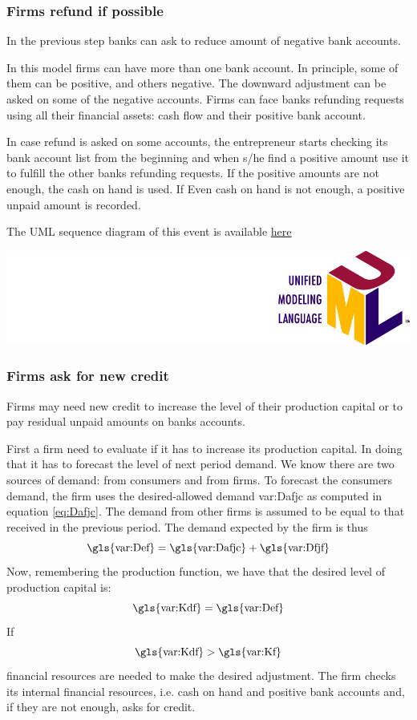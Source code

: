 \documentclass{book}
\newcommand{\doclocation}{file:///Users/giulioni/Documents/workspace/gabriele/docs}
\begin{document}
\subsubsection{Firms refund if possible}
In the previous step banks can ask to reduce amount of negative bank accounts. 

In this model firms can have more than one bank account. In principle, some of them can be positive, and others negative. The downward adjustment can be asked on some of the negative accounts.  Firms can face banks refunding requests using all their financial assets: cash flow and their positive bank account. 

In case refund is asked on some accounts, the entrepreneur starts checking its bank account list from the beginning and when s/he find a positive amount use it to fulfill the other banks refunding requests.
If the positive amounts are not enough, the cash on hand is used. If Even cash on hand is not enough, a positive unpaid amount is recorded.

The UML sequence diagram of this event is available \href{\doclocation/umldoc/firms_payBackBankDebt.html}{here}
\begin{marginfigure}
	\includegraphics[scale=0.1]{uml.png}
\end{marginfigure}


\subsubsection{Firms ask for new credit}

Firms may need new credit to increase the level of their production capital or to pay residual unpaid amounts on banks accounts.

First a firm need to evaluate if it has to increase its production capital. In doing that it has to forecast the level of next period demand. We know there are two sources of demand: from consumers and from firms. To forecast the consumers demand, the firm uses the desired-allowed demand \gls{var:Dafjc} as computed in equation \ref{eq:Dafjc}.   
The demand from other firms is assumed to be equal to that received in the previous period. The demand expected by the firm is thus
\[
	\textnormal{\gls{var:Def}}=\textnormal{\gls{var:Dafjc}}+\textnormal{\gls{var:Dfjf}}
\]
Now, remembering the production function, we have that the desired level of production capital is:
\[
	\textnormal{\gls{var:Kdf}}=\textnormal{\gls{var:Def}}
\]
If 
\[
\textnormal{\gls{var:Kdf}}>\textnormal{\gls{var:Kf}}
\]
financial resources are needed to make the desired adjustment. The firm checks its internal financial resources, i.e. cash on hand and positive bank accounts and, if they are not enough, asks for credit. 
\end{document}
